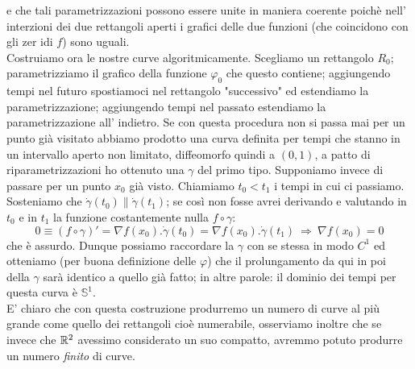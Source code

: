 e che tali parametrizzazioni possono essere unite in maniera coerente poichè nell' interzioni dei due rettangoli aperti i grafici delle due funzioni (che coincidono con gli zer idi $f$) sono uguali.\\
Costruiamo ora le nostre curve algoritmicamente. Scegliamo un rettangolo $R_0$; parametrizziamo il grafico della funzione $\varphi_0$ che questo contiene; aggiungendo tempi nel futuro spostiamoci nel rettangolo "successivo" ed estendiamo la parametrizzazione; aggiungendo tempi nel passato estendiamo la parametrizzazione all' indietro. Se con questa procedura non si passa mai per un punto già visitato abbiamo prodotto una curva definita per tempi che stanno in un intervallo aperto non limitato, diffeomorfo quindi a $(0,1)$, a patto di riparametrizzazioni ho ottenuto una $\gamma$ del primo tipo. Supponiamo invece di passare per un punto $x_0$ già visto. Chiamiamo $t_0< t_1$ i tempi in cui ci passiamo. Sosteniamo che $\dot{\gamma}(t_0)\parallel \dot{\gamma}(t_1)$; se così non fosse avrei derivando e valutando in $t_0$ e in $t_1$ la funzione costantemente nulla $f\circ\gamma$:
$$
0\equiv(f\circ\gamma)'=\nabla f(x_0). \dot{\gamma}(t_0)=\nabla f (x_0) . \dot{\gamma}(t_1)\ \Rightarrow \ \nabla f (x_0)=0
$$ 
che è assurdo. Dunque possiamo raccordare la $\gamma$ con se stessa in modo $C^1$ ed otteniamo (per buona definizione delle $\varphi$) che il prolungamento da qui in poi della $\gamma$ sarà identico a quello già fatto; in altre parole: il dominio dei tempi per questa curva è $\mathbb{S}^1$. \\
E' chiaro che con questa costruzione produrremo un numero di curve al più grande come quello dei rettangoli cioè numerabile, osserviamo inoltre che se invece che $\mathbb{R}^2$ avessimo considerato un suo compatto, avremmo potuto produrre un numero {\it finito} di curve.  
